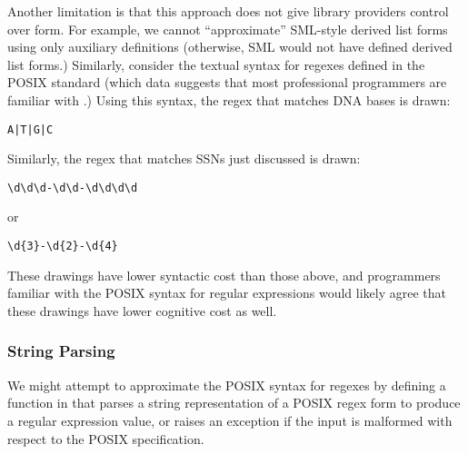 Another limitation is that this approach does not give library providers control over form. For example, we cannot ``approximate'' SML-style derived list forms using only auxiliary definitions (otherwise, SML would not have defined derived list forms.) 
Similarly, consider the textual syntax for regexes defined in the POSIX standard \cite{STD95954} (which data suggests that most professional programmers are familiar with \cite{Omar:2012:ACC:2337223.2337324}.) Using this syntax, the regex that matches DNA bases is drawn:
\begin{lstlisting}[numbers=none]
A|T|G|C
\end{lstlisting}
Similarly, the regex that matches SSNs just discussed is drawn:
\begin{lstlisting}[numbers=none]
\d\d\d-\d\d-\d\d\d\d
\end{lstlisting}
or
\begin{lstlisting}[numbers=none]
\d{3}-\d{2}-\d{4}
\end{lstlisting}
These drawings have lower syntactic cost than those above, and programmers familiar with the POSIX syntax for regular expressions would likely agree that these drawings have lower cognitive cost as well. 

\vspace{-6px}
\subsubsection{String Parsing}\label{sec:dynamic-string-parsing}
We might attempt to approximate the POSIX syntax for regexes by defining a function  in  that parses a string representation of a POSIX regex form  to produce a regular expression value, or raises an exception if the input is malformed with respect to the POSIX specification. 

